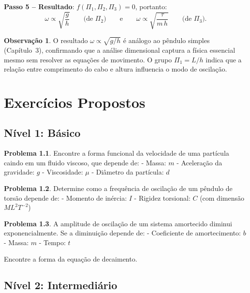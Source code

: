 \documentclass[12pt,a4paper,oneside]{book}
\theoremstyle{definition}
\newtheorem{remark}[definition]{Observação}
\newtheorem{problem}{Problema}
\begin{document}
\textbf{Passo 5 -- Resultado}: $f\!\left(\Pi_1, \Pi_2, \Pi_3\right) = 0$, portanto:
\begin{equation}
\omega \propto \sqrt{\frac{g}{h}} \qquad \text{(de } \Pi_2\text{)}
\qquad\text{e}\qquad
\omega \propto \sqrt{\frac{\tau}{m\,h}} \qquad \text{(de } \Pi_3\text{)}.
\end{equation}

\begin{remark}
O resultado $\omega \propto \sqrt{g/h}$ é análogo ao pêndulo simples (Capítulo~3),
confirmando que a análise dimensional captura a física essencial mesmo sem resolver
as equações de movimento. O grupo $\Pi_1 = L/h$ indica que a relação entre comprimento
do cabo e altura influencia o modo de oscilação.
\end{remark}

\appendix
\chapter{Exercícios Propostos}

\section{Nível 1: Básico}

\begin{problem}
Encontre a forma funcional da velocidade de uma partícula caindo em um fluido viscoso, que depende de:
- Massa: $m$
- Aceleração da gravidade: $g$
- Viscosidade: $\mu$
- Diâmetro da partícula: $d$
\end{problem}

\begin{problem}
Determine como a frequência de oscilação de um pêndulo de torsão depende de:
- Momento de inércia: $I$
- Rigidez torsional: $C$ (com dimensão $ML^2T^{-2}$)
\end{problem}

\begin{problem}
A amplitude de oscilação de um sistema amortecido diminui exponencialmente. Se a diminuição depende de:
- Coeficiente de amortecimento: $b$
- Massa: $m$
- Tempo: $t$

Encontre a forma da equação de decaimento.
\end{problem}

\section{Nível 2: Intermediário}
\end{document}
